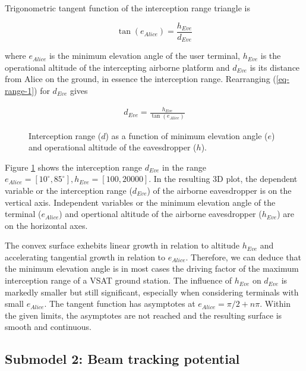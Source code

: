 \documentclass[english, 12pt, a4paper, elec, utf8, a-1b, online]{aaltothesis}
\begin{document}
Trigonometric tangent function of the interception range triangle is

\begin{equation} \label{eq-range-1}
  \tan(e_{Alice}) = \frac{h_{Eve}}{d_{Eve}}
\end{equation}

\noindent
where $e_{Alice}$ is the minimum elevation angle of the user terminal, $h_{Eve}$ is the operational altitude of the intercepting airborne platform and $d_{Eve}$ is its distance from Alice on the ground, in essence the interception range.
Rearranging (\ref{eq-range-1}) for $d_{Eve}$ gives

\begin{align} \label{eq-range-2}
  d_{Eve} = \frac{h_{Eve}}{\tan(e_{Alice})}
\end{align}

\begin{figure}[h]
  \centering
  
  \caption{Interception range ($d$) as a function of minimum elevation angle ($e$) and operational altitude of the eavesdropper ($h$).}
  \label{fig-interception-range}
\end{figure}

Figure \ref{fig-interception-range} shows the interception range $d_{Eve}$ in the range $e_{Alice} = [10^\circ, 85^\circ], h_{Eve} = [100,20000]$.
In the resulting 3D plot, the dependent variable or the interception range ($d_{Eve}$) of the airborne eavesdropper is on the vertical axis.
Independent variables or the minimum elevation angle of the terminal ($e_{Alice}$) and opertional altitude of the airborne eavesdropper ($h_{Eve}$) are on the horizontal axes.

The convex surface exhebits linear growth in relation to altitude $h_{Eve}$ and accelerating tangential growth in relation to $e_{Alice}$.
Therefore, we can deduce that the minimum elevation angle is in most cases the driving factor of the maximum interception range of a VSAT ground station.
The influence of $h_{Eve}$ on $d_{Eve}$ is markedly smaller but still significant, especially when considering terminals with small $e_{Alice}$.
The tangent function has asymptotes at $e_{Alice} = \pi / 2 + n\pi$. Within the given limits, the asymptotes are not reached and the resulting surface is smooth and continuous.


\subsection{Submodel 2: Beam tracking potential}
\end{document}
